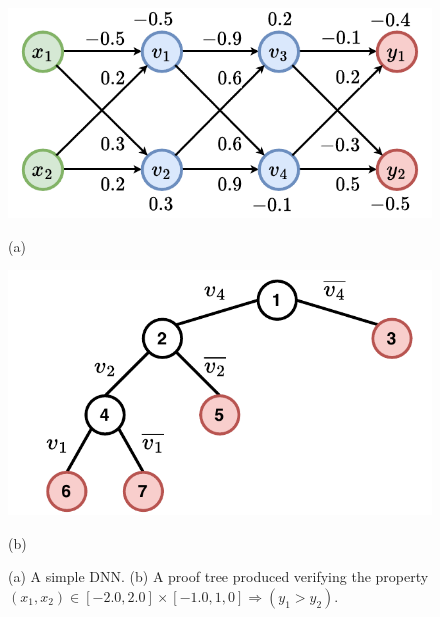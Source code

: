 \documentclass[oneside,11pt,dvipsnames]{book}
\newcommand{\nnproofformat}{\texttt{APTP}}
\newcommand{\bab}{\texttt{BaB$_{\text{NV}}$}}
\newcommand{\neuralsat}{\texttt{NeuralSAT}}
\begin{document}




\begin{figure}[t]
    \begin{minipage}[b]{\linewidth}
        \centering
        \begin{minipage}[t]{0.48\textwidth}
            \centering  
            \includegraphics[width=\linewidth]{figure/proof_net.pdf}
            \caption*{(a)}
        \end{minipage}
        \begin{minipage}[t]{0.48\textwidth}
            \centering
            \includegraphics[width=\linewidth]{figure/proof_tree.pdf}
            \caption*{(b)}
        \end{minipage}
        \caption{(a) A simple DNN.  (b) A proof tree produced verifying the property $(x_1, x_2) \in [-2.0, 2.0] \times [-1.0, 1,0] \Rightarrow (y_1 > y_2)$.}
        \label{fig:example}
    \end{minipage}
\end{figure}
\end{document}
